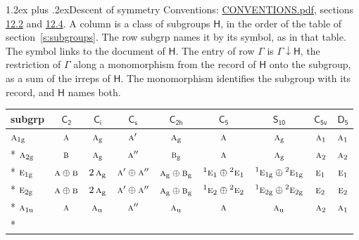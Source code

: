 \documentclass[10pt,a4paper]{article}
\makeatletter
\renewcommand\section{\@startsection{section}{1}{\z@}{-3ex plus -1ex minus -.2ex}%
  {1.2ex plus .2ex}{\normalfont\large\sffamily\bfseries\color{parttitle}}}
\numberwithin{equation}{section}
\newcommand{\grp}[1]{\mathsf{#1}}
\newcommand{\irr}[1]{\text{\normalfont\scshape #1}}
\newcommand{\conjpair}[1]{{}^{#1}}
\newcommand{\ptag}[1]{\mathrm{#1}}
\newcommand{\restr}[2]{#1\!\downarrow#2}
\makeatother
\begin{document}
\section{Descent of symmetry}\label{s:subduction}
Conventions: \href{../../CONVENTIONS.pdf}{CONVENTIONS.pdf}, sections \href{../../CONVENTIONS.pdf\#conv.12.2}{12.2} and \href{../../CONVENTIONS.pdf\#conv.12.4}{12.4}.
A column is a class of subgroups $\grp{H}$, in the order of the table of section~\ref{s:subgroups}. The row subgrp names it by its symbol, as in that table. The symbol links to the document of $\grp{H}$. The entry of row $\Gamma$ is $\restr{\Gamma}{\grp{H}}$, the restriction of $\Gamma$ along a monomorphism from the record of $\grp{H}$ onto the subgroup, as a sum of the irreps of $\grp{H}$. The monomorphism identifies the subgroup with its record, and $\grp{H}$ names both.
{\small\begin{longtable}{@{}lcccccccc@{}}\toprule
subgrp & \href{C2.pdf}{$\grp{C_{2}}$} & \href{S2.pdf}{$\grp{C_{i}}$} & \href{C1v.pdf}{$\grp{C_{s}}$} & \href{C2h.pdf}{$\grp{C_{2h}}$} & \href{C5.pdf}{$\grp{C_{5}}$} & \href{S10.pdf}{$\grp{S_{10}}$} & \href{C5v.pdf}{$\grp{C_{5v}}$} & \href{D5.pdf}{$\grp{D_{5}}$}\\\midrule\endhead
\bottomrule\endfoot\endlastfoot
$\irr{a}_{1\ptag{g}}$ & $\irr{a}$ & $\irr{a}_{\ptag{g}}$ & $\irr{a}'$ & $\irr{a}_{\ptag{g}}$ & $\irr{a}$ & $\irr{a}_{\ptag{g}}$ & $\irr{a}_{1}$ & $\irr{a}_{1}$\\*
$\irr{a}_{2\ptag{g}}$ & $\irr{b}$ & $\irr{a}_{\ptag{g}}$ & $\irr{a}''$ & $\irr{b}_{\ptag{g}}$ & $\irr{a}$ & $\irr{a}_{\ptag{g}}$ & $\irr{a}_{2}$ & $\irr{a}_{2}$\\*
$\irr{e}_{1\ptag{g}}$ & $\irr{a}\oplus \irr{b}$ & $2\,\irr{a}_{\ptag{g}}$ & $\irr{a}'\oplus \irr{a}''$ & $\irr{a}_{\ptag{g}}\oplus \irr{b}_{\ptag{g}}$ & $\conjpair{1}\irr{e}_{1}\oplus \conjpair{2}\irr{e}_{1}$ & $\conjpair{1}\irr{e}_{1\ptag{g}}\oplus \conjpair{2}\irr{e}_{1\ptag{g}}$ & $\irr{e}_{1}$ & $\irr{e}_{1}$\\*
$\irr{e}_{2\ptag{g}}$ & $\irr{a}\oplus \irr{b}$ & $2\,\irr{a}_{\ptag{g}}$ & $\irr{a}'\oplus \irr{a}''$ & $\irr{a}_{\ptag{g}}\oplus \irr{b}_{\ptag{g}}$ & $\conjpair{1}\irr{e}_{2}\oplus \conjpair{2}\irr{e}_{2}$ & $\conjpair{1}\irr{e}_{2\ptag{g}}\oplus \conjpair{2}\irr{e}_{2\ptag{g}}$ & $\irr{e}_{2}$ & $\irr{e}_{2}$\\*
$\irr{a}_{1\ptag{u}}$ & $\irr{a}$ & $\irr{a}_{\ptag{u}}$ & $\irr{a}''$ & $\irr{a}_{\ptag{u}}$ & $\irr{a}$ & $\irr{a}_{\ptag{u}}$ & $\irr{a}_{2}$ & $\irr{a}_{1}$\\*

\end{longtable}}
\end{document}

